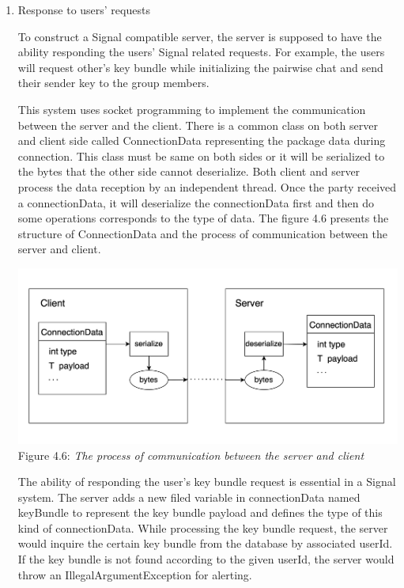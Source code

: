 \begin{enumerate}[label=(\roman*)]
\item Response to users' requests

To construct a Signal compatible server, the server is supposed to have the ability responding the users' Signal related requests. For example, the users will request other's key bundle while initializing the pairwise chat and send their sender key to the group members.

This system uses socket programming to implement the communication between the server and the client. There is a common class on both server and client side called ConnectionData representing the package data during connection. This class must be same on both sides or it will be serialized to the bytes that the other side cannot deserialize. Both client and server process the data reception by an independent thread. Once the party received a connectionData, it will deserialize the connectionData first and then do some operations corresponds to the type of data. The figure 4.6 presents the structure of ConnectionData and the process of communication between the server and client.

\begin{center}
\includegraphics[scale=.3]{../4-Implementation/resources/Figure4-6.png}\\
Figure 4.6: \textit{The process of communication between the server and client}
\end{center}

The ability of responding the user's key bundle request is essential in a Signal system. The server adds a new filed variable in connectionData named keyBundle to represent the key bundle payload and defines the type of this kind of connectionData. While processing the key bundle request, the server would inquire the certain key bundle from the database by associated userId. If the key bundle is not found according to the given userId, the server would throw an IllegalArgumentException for alerting.


\end{enumerate}
